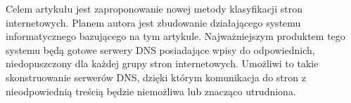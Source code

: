 \documentclass[10pt,twoside,a4paper]{article}
\begin{document}
Celem artykułu jest zaproponowanie nowej metody klasyfikacji stron internetowych. Planem autora jest zbudowanie działającego systemu informatycznego bazującego na tym artykule. Najważniejszym produktem tego systemu będą gotowe serwery DNS posiadające wpisy do odpowiednich, niedopuszczony dla każdej grupy stron internetowych. Umożliwi to takie skonstruowanie serwerów DNS, dzięki którym komunikacja do stron z nieodpowiednią treścią będzie niemożliwa lub znacząco utrudniona.







\end{document}
